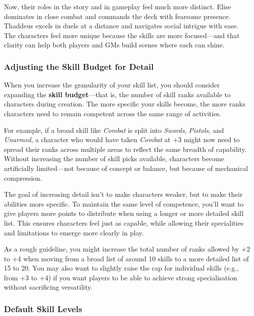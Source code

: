 Now, their roles in the story and in gameplay feel much more distinct. Elise dominates in close combat and commands the deck with fearsome presence. Thaddeus excels in duels at a distance and navigates social intrigue with ease. The characters feel more unique because the skills are more focused—and that clarity can help both players and GMs build scenes where each can shine.


\subsubsection{Adjusting the Skill Budget for Detail}

When you increase the granularity of your skill list, you should consider expanding the \textbf{skill budget}—that is, the number of skill ranks available to characters during creation. The more specific your skills become, the more ranks characters need to remain competent across the same range of activities.

For example, if a broad skill like \textit{Combat} is split into \textit{Swords}, \textit{Pistols}, and \textit{Unarmed}, a character who would have taken \textit{Combat} at +3 might now need to spread their ranks across multiple areas to reflect the same breadth of capability. Without increasing the number of skill picks available, characters become artificially limited—not because of concept or balance, but because of mechanical compression.

The goal of increasing detail isn’t to make characters weaker, but to make their abilities more specific. To maintain the same level of competence, you’ll want to give players more points to distribute when using a longer or more detailed skill list. This ensures characters feel just as capable, while allowing their specialities and limitations to emerge more clearly in play.

As a rough guideline, you might increase the total number of ranks allowed by +2 to +4 when moving from a broad list of around 10 skills to a more detailed list of 15 to 20. You may also want to slightly raise the cap for individual skills (e.g., from +3 to +4) if you want players to be able to achieve strong specialisation without sacrificing versatility.


\subsubsection{Default Skill Levels}

